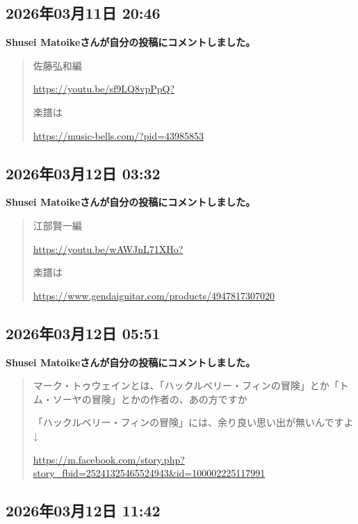 \subsection*{2026年03月11日 20:46}

\textbf{Shusei Matoikeさんが自分の投稿にコメントしました。}

\begin{quote}
佐藤弘和編

\url{https://youtu.be/sf9LQ8vpPpQ?}

楽譜は

\url{https://music-bells.com/?pid=43985853}
\end{quote}

\subsection*{2026年03月12日 03:32}

\textbf{Shusei Matoikeさんが自分の投稿にコメントしました。}

\begin{quote}
江部賢一編

\url{https://youtu.be/wAWJnL71XHo?}

楽譜は

\url{https://www.gendaiguitar.com/products/4947817307020}
\end{quote}

\subsection*{2026年03月12日 05:51}

\textbf{Shusei Matoikeさんが自分の投稿にコメントしました。}

\begin{quote}
マーク・トゥウェインとは、「ハックルベリー・フィンの冒険」とか「トム・ソーヤの冒険」とかの作者の、あの方ですか

「ハックルベリー・フィンの冒険」には、余り良い思い出が無いんですよ↓

\url{https://m.facebook.com/story.php?story_fbid=25241325465524943&id=100002225117991}
\end{quote}

\subsection*{2026年03月12日 11:42}


